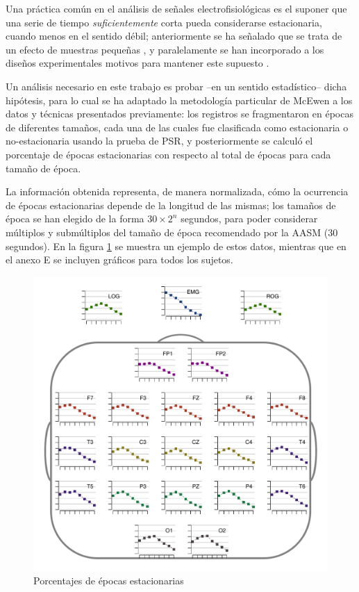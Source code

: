 Una práctica común en el análisis de señales electrofisiológicas es el suponer que una serie de 
tiempo \textit{suficientemente} corta pueda considerarse estacionaria, cuando menos en el sentido
débil; anteriormente se ha señalado que se trata de un efecto de muestras pequeñas \cite{Melard89},
y paralelamente se han incorporado a los diseños experimentales motivos para mantener este supuesto
\cite{Kaiser00}.

Un análisis necesario en este trabajo es probar --en un sentido estadístico-- dicha hipótesis, para 
lo cual se ha adaptado la metodología particular de McEwen \cite{McEwen75} a los datos y técnicas 
presentados previamente: los registros se fragmentaron en épocas de diferentes tamaños, cada una de 
las cuales fue clasificada como estacionaria o no-estacionaria usando la prueba de PSR, y 
posteriormente se calculó el porcentaje de épocas estacionarias con respecto al total de épocas
para cada tamaño de época. 

La información obtenida representa, de manera normalizada, cómo la ocurrencia de épocas 
estacionarias depende de la longitud de las mismas; los tamaños de época se han elegido de la forma 
$30\times 2^{n}$ segundos, para poder considerar múltiplos y submúltiplos del tamaño de época
recomendado por la AASM (30 segundos).
En la figura \ref{cabeza_repoio} se muestra un ejemplo de estos datos, mientras que en el anexo E
se incluyen gráficos para todos los sujetos.


\begin{figure}
\centering
\includegraphics[width=.9\linewidth]{./img_resultados/VCNNS1_cabeza_epocas_.pdf}
\caption{Porcentajes de épocas estacionarias}
\label{cabeza_repoio}
\end{figure}

